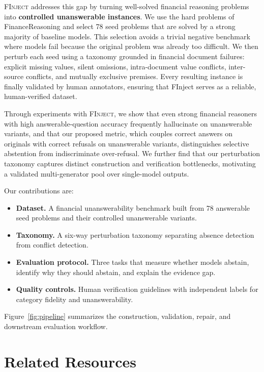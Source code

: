 \documentclass[sigconf,review]{acmart}
\newcommand{\bench}{\textsc{FInject}\xspace}
\begin{document}
\bench addresses this gap by turning well-solved financial reasoning problems into \textbf{controlled unanswerable instances}.
We use the hard problems of FinanceReasoning and select 78 seed problems that are solved by a strong majority of baseline models.
This selection avoids a trivial negative benchmark where models fail because the original problem was already too difficult.
We then perturb each seed using a taxonomy grounded in financial document failures: explicit missing values, silent omissions, intra-document value conflicts, inter-source conflicts, and mutually exclusive premises.
Every resulting instance is finally validated by human annotators, ensuring that FInject serves as a reliable, human-verified dataset.

Through experiments with \bench, we show that even strong financial reasoners with high answerable-question accuracy frequently hallucinate on unanswerable variants, and that our proposed metric, which couples correct answers on originals with correct refusals on unanswerable variants, distinguishes selective abstention from indiscriminate over-refusal. 
We further find that our perturbation taxonomy captures distinct construction and verification bottlenecks, motivating a validated multi-generator pool over single-model outputs.

Our contributions are:
\begin{itemize}
  \item \textbf{Dataset.} A financial unanswerability benchmark built from 78 answerable seed problems and their controlled unanswerable variants.
  \item \textbf{Taxonomy.} A six-way perturbation taxonomy separating absence detection from conflict detection.
  \item \textbf{Evaluation protocol.} Three tasks that measure whether models abstain, identify why they should abstain, and explain the evidence gap.
  \item \textbf{Quality controls.} Human verification guidelines with independent labels for category fidelity and unanswerability.
\end{itemize}
Figure~\ref{fig:pipeline} summarizes the construction, validation, repair, and downstream evaluation workflow.

\section{Related Resources}
\end{document}
